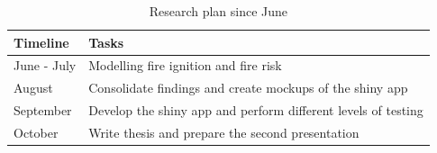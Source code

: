 \documentclass[11pt,a4paper,]{article}
\begin{document}
\begin{table}[!h]

\caption{\label{tab:timeline2}Research plan since June}
\centering
\begin{tabular}{ll}
\toprule
Timeline & Tasks\\
\midrule
June - July & Modelling fire ignition and fire risk\\
August & Consolidate findings and create mockups of the shiny app\\
September & Develop the shiny app and perform different levels of testing\\
October & Write thesis and prepare the second presentation\\
\bottomrule
\end{tabular}
\end{table}

\printbibliography
\end{document}
